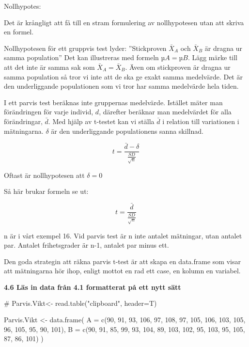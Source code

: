 \documentclass[
  letterpaper,
  DIV=11,
  numbers=noendperiod]{scrartcl}
\newenvironment{Shaded}{\begin{snugshade}}{\end{snugshade}}
\newcommand{\AttributeTok}[1]{\textcolor[rgb]{0.40,0.45,0.13}{#1}}
\newcommand{\CommentTok}[1]{\textcolor[rgb]{0.37,0.37,0.37}{#1}}
\newcommand{\DecValTok}[1]{\textcolor[rgb]{0.68,0.00,0.00}{#1}}
\newcommand{\FunctionTok}[1]{\textcolor[rgb]{0.28,0.35,0.67}{#1}}
\newcommand{\NormalTok}[1]{\textcolor[rgb]{0.00,0.23,0.31}{#1}}
\newcommand{\OtherTok}[1]{\textcolor[rgb]{0.00,0.23,0.31}{#1}}
\begin{document}
Nollhypotes:

Det är krångligt att få till en stram formulering av nollhypotesen utan
att skriva en formel.

Nollhypotesen för ett gruppvis test lyder: ''Stickproven \(\bar{X}_A\)
och \(\bar{X}_B\) är dragna ur samma population'' Det kan illustreras
med formeln \(µA = µB\). Lägg märke till att det inte är samma sak som
\(\bar{X}_A =\bar{X}_B\). Även om stickproven är dragna ur samma
population så tror vi inte att de ska ge exakt samma medelvärde. Det är
den underliggande populationen som vi tror har samma medelvärde hela
tiden.

I ett parvis test beräknas inte gruppernas medelvärde. Istället mäter
man förändringen för varje individ, \(d\), därefter beräknar man
medelvärdet för alla förändringar, \(\bar{d}\). Med hjälp av t-testet
kan vi ställa \(\bar{d}\) i relation till variationen i mätningarna.
\(δ\) är den underliggande populationens sanna skillnad.

\[
t = \frac{\bar{d} - \delta}{\frac{SD}{\sqrt{n}}}
\]

Oftast är nollhypotesen att \(δ = 0\)

Så här brukar formeln se ut:

\[
t = \frac{\bar{d}}{\frac{SD}{\sqrt{n}}}
\]

n är i vårt exempel 16. Vid parvis test är n inte antalet mätningar,
utan antalet par. Antalet frihetsgrader är n-1, antalet par minus ett.

Den goda strategin att räkna parvis t-test är att skapa en data.frame
som visar att mätningarna hör ihop, enligt mottot en rad ett case, en
kolumn en variabel.

\textbf{4.6 Läs in data från 4.1 formatterat på ett nytt sätt}

\begin{Shaded}
\begin{Highlighting}[]
\CommentTok{\# Parvis.Vikt\textless{}{-} read.table("clipboard", header=T)}

\NormalTok{Parvis.Vikt }\OtherTok{\textless{}{-}} \FunctionTok{data.frame}\NormalTok{(}
  \AttributeTok{A =} \FunctionTok{c}\NormalTok{(}\DecValTok{90}\NormalTok{, }\DecValTok{91}\NormalTok{, }\DecValTok{93}\NormalTok{, }\DecValTok{106}\NormalTok{, }\DecValTok{97}\NormalTok{, }\DecValTok{108}\NormalTok{, }\DecValTok{97}\NormalTok{, }\DecValTok{105}\NormalTok{,}
  \DecValTok{106}\NormalTok{, }\DecValTok{103}\NormalTok{, }\DecValTok{105}\NormalTok{, }\DecValTok{96}\NormalTok{, }\DecValTok{105}\NormalTok{, }\DecValTok{95}\NormalTok{, }\DecValTok{90}\NormalTok{, }\DecValTok{101}\NormalTok{),}
  \AttributeTok{B =} \FunctionTok{c}\NormalTok{(}\DecValTok{90}\NormalTok{, }\DecValTok{91}\NormalTok{, }\DecValTok{85}\NormalTok{, }\DecValTok{99}\NormalTok{, }\DecValTok{93}\NormalTok{, }\DecValTok{104}\NormalTok{, }\DecValTok{89}\NormalTok{, }\DecValTok{103}\NormalTok{,}
  \DecValTok{102}\NormalTok{, }\DecValTok{95}\NormalTok{, }\DecValTok{103}\NormalTok{, }\DecValTok{95}\NormalTok{, }\DecValTok{105}\NormalTok{, }\DecValTok{87}\NormalTok{, }\DecValTok{86}\NormalTok{, }\DecValTok{101}\NormalTok{)}
\NormalTok{)}
\end{Highlighting}
\end{Shaded}
\end{document}
